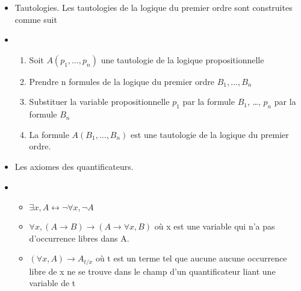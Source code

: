 \documentclass{article}
\begin{document}
\begin{itemize}
  \item Tautologies. Les tautologies de la logique du premier ordre
        sont construites comme suit
  \item[] \begin{enumerate}
      \item
            Soit $A(p_1, \dots , p_n)$ une tautologie de la logique propositionnelle
      \item Prendre n formules de la logique du premier ordre $B_1, \dots , B_n$
      \item Substituer la variable propositionnelle $p_1$ par la formule $B_1$, \dots, $p_n$ par la formule $B_n$
      \item La formule $A(B_1, \dots , B_n)$ est une tautologie de la logique du premier ordre.
    \end{enumerate}
  \item Les axiomes des quantificateurs.
  \item[] \begin{itemize}
      \item $\exists x, A \leftrightarrow \neg \forall x, \neg A$
      \item $\forall x,(A \rightarrow B) \rightarrow (A \rightarrow \forall x, B)$ où x est une variable qui n’a pas d’occurrence libres dans A.
      \item $(\forall x, A) \rightarrow A_{t / x}$ où t est un terme tel que aucune aucune occurrence libre de x ne se trouve dans le champ d'un quantificateur liant une variable de t
    \end{itemize}
\end{itemize}
\newpage
\end{document}
